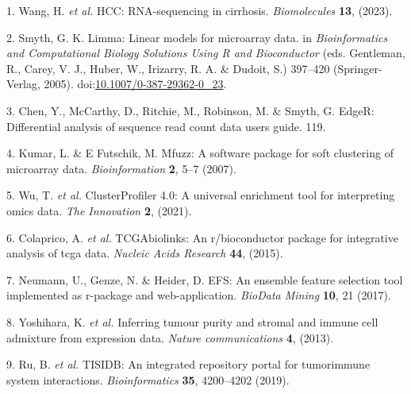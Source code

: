 \documentclass[
]{article}
\newenvironment{cslreferences}%
  {}%
  {\par}
\begin{document}
\hypertarget{refs}{}
\begin{cslreferences}
\leavevmode\hypertarget{ref-HCC_RNA_Sequen_Wang_2023}{}%
1. Wang, H. \emph{et al.} HCC: RNA-sequencing in cirrhosis. \emph{Biomolecules} \textbf{13}, (2023).

\leavevmode\hypertarget{ref-LimmaLinearMSmyth2005}{}%
2. Smyth, G. K. Limma: Linear models for microarray data. in \emph{Bioinformatics and Computational Biology Solutions Using R and Bioconductor} (eds. Gentleman, R., Carey, V. J., Huber, W., Irizarry, R. A. \& Dudoit, S.) 397--420 (Springer-Verlag, 2005). doi:\href{https://doi.org/10.1007/0-387-29362-0_23}{10.1007/0-387-29362-0\_23}.

\leavevmode\hypertarget{ref-EdgerDifferenChen}{}%
3. Chen, Y., McCarthy, D., Ritchie, M., Robinson, M. \& Smyth, G. EdgeR: Differential analysis of sequence read count data users guide. 119.

\leavevmode\hypertarget{ref-Mfuzz_a_softwa_Kumar_2007}{}%
4. Kumar, L. \& E Futschik, M. Mfuzz: A software package for soft clustering of microarray data. \emph{Bioinformation} \textbf{2}, 5--7 (2007).

\leavevmode\hypertarget{ref-ClusterprofilerWuTi2021}{}%
5. Wu, T. \emph{et al.} ClusterProfiler 4.0: A universal enrichment tool for interpreting omics data. \emph{The Innovation} \textbf{2}, (2021).

\leavevmode\hypertarget{ref-TcgabiolinksAColapr2015}{}%
6. Colaprico, A. \emph{et al.} TCGAbiolinks: An r/bioconductor package for integrative analysis of tcga data. \emph{Nucleic Acids Research} \textbf{44}, (2015).

\leavevmode\hypertarget{ref-EfsAnEnsemblNeuman2017}{}%
7. Neumann, U., Genze, N. \& Heider, D. EFS: An ensemble feature selection tool implemented as r-package and web-application. \emph{BioData Mining} \textbf{10}, 21 (2017).

\leavevmode\hypertarget{ref-Inferring_tumou_Yoshih_2013}{}%
8. Yoshihara, K. \emph{et al.} Inferring tumour purity and stromal and immune cell admixture from expression data. \emph{Nature communications} \textbf{4}, (2013).

\leavevmode\hypertarget{ref-TISIDB_an_inte_Ru_Be_2019}{}%
9. Ru, B. \emph{et al.} TISIDB: An integrated repository portal for tumorimmune system interactions. \emph{Bioinformatics} \textbf{35}, 4200--4202 (2019).
\end{cslreferences}
\end{document}
